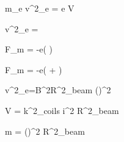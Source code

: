 

\large {} m_{e} v^{2}_{e} = e V 


\large v^{2}_{e} = 


\large \lvert F_{m} \rvert = \lvert -e( \times {}) \rvert 


\large \lvert F_{m} \rvert = \lvert -e(\vec{\varepsilon} +  \times {}) \rvert 


\large v^{2}_{e}=B^{2}R^{2}_{beam} ()^{2}


\large V =  k^{2}_{coils} i^{2} R^{2}_{beam} 

\large m =  ()^{2} R^{2}_{beam} 



